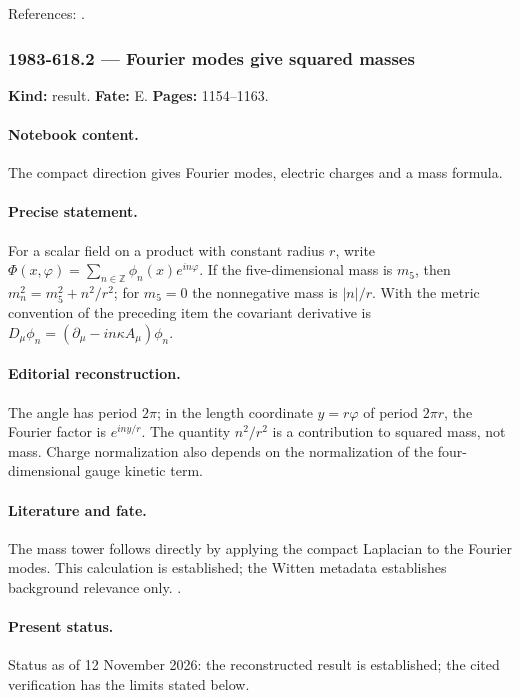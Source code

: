 \noindent References: \citep{witten1981kaluza}.\par

\subsubsection{1983-618.2 --- Fourier modes give squared masses}

\label{item:1983-618.2}

\noindent\textbf{Kind:} result. \textbf{Fate:} E. \textbf{Pages:} 1154--1163.\par

\paragraph{Notebook content.} The compact direction gives Fourier modes, electric charges and a mass formula.

\paragraph{Precise statement.} For a scalar field on a product with constant radius $r$, write $\Phi(x,\varphi)=\sum_{n\in\mathbb Z}\phi_n(x)e^{in\varphi}$. If the five-dimensional mass is $m_5$, then $m_n^2=m_5^2+n^2/r^2$; for $m_5=0$ the nonnegative mass is $|n|/r$. With the metric convention of the preceding item the covariant derivative is $D_\mu\phi_n=(\partial_\mu-in\kappa A_\mu)\phi_n$.

\paragraph{Editorial reconstruction.} The angle has period $2\pi$; in the length coordinate $y=r\varphi$ of period $2\pi r$, the Fourier factor is $e^{iny/r}$. The quantity $n^2/r^2$ is a contribution to squared mass, not mass. Charge normalization also depends on the normalization of the four-dimensional gauge kinetic term.

\paragraph{Literature and fate.} The mass tower follows directly by applying the compact Laplacian to the Fourier modes. This calculation is established; the Witten metadata establishes background relevance only. \citep{witten1981kaluza}.

\paragraph{Present status.} Status as of 12 November 2026: the reconstructed result is established; the cited verification has the limits stated below.

